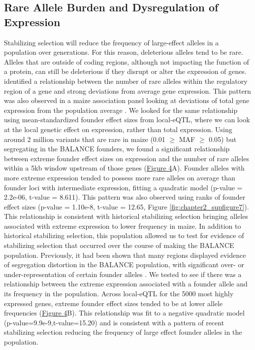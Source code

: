\documentclass[article,9pt,twocolumn,twoside]{rilabRxiv}
\begin{document}
\subsection{Rare Allele Burden and Dysregulation of Expression}
Stabilizing selection will reduce the frequency of large-effect alleles in a population over generations.
For this reason, deleterious alleles tend to be rare.
Alleles that are outside of coding regions, although not impacting the function of a protein, can still be deleterious if they disrupt or alter the expression of genes.
\cite{Zhao} identified a relationship between the number of rare alleles within the regulatory region of a gene and strong deviations from average gene expression.
This pattern was also observed in a maize association panel looking at deviations of total gene expression from the population average \citep{Kremling2}.
We looked for the same relationship using mean-standardized founder effect sizes from local-eQTL, where we can look at the local genetic effect on expression, rather than total expression.
Using around 2 million variants that are rare in maize (0.01 $\ge$ MAF $\ge$ 0.05) but segregating in the BALANCE founders, we found a significant relationship between extreme founder effect sizes on expression and the number of rare alleles within a 5kb window upstream of those genes (\hyperref[fig:smile_frownfigure]{Figure 4}A).
Founder alleles with more extreme expression tended to possess more rare alleles on average than founder loci with intermediate expression, fitting a quadratic model (p-value = 2.2e-06, t-value = 8.611).
This pattern was also observed using ranks of founder effect sizes (p-value = 1.10e-8, t-value = 12.65, Figure \ref{fig:chapter2_supfigure7}).
This relationship is consistent with historical stabilizing selection bringing alleles associated with extreme expression to lower frequency in maize.
In addition to historical stabilizing selection, this population allowed us to test for evidence of stabilizing selection that occurred over the course of making the BALANCE population.
Previously, it had been shown that many regions displayed evidence of segregation distortion in the BALANCE population, with significant over- or under-representation of certain founder alleles \citep{Odell}.
We tested to see if there was a relationship between the extreme expression associated with a founder allele and its frequency in the population.
Across local-eQTL for the 5000 most highly expressed genes, extreme founder effect sizes tended to be at lower allele frequencies (\hyperref[fig:smile_frownfigure]{Figure 4}B).
This relationship was fit to a negative quadratic model (p-value=9.9e-9,t-value=15.20) and is consistent with a pattern of recent stabilizing selection reducing the frequency of large effect founder alleles in the population.
\end{document}
